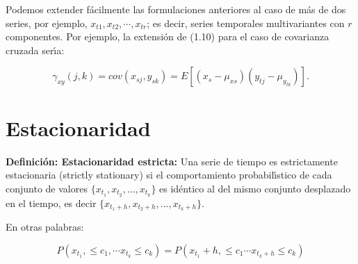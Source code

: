 
Podemos extender f\'acilmente las formulaciones anteriores al caso de m\'as de dos series, por ejemplo, $x_{t1}, x_{t2},\cdots, x_{tr}$; es decir, series temporales multivariantes con $r$ componentes. Por ejemplo, la extensi\'on de (1.10) para el caso de covarianza cruzada ser\'\i{}a:

\begin{equation*}
\gamma_{xy} (j, k) = cov (x_{sj}, y_{sk}) = E [(x_s -\mu_{xs}) (y_{tj} - \mu_{y_{tk}})].
\end{equation*}

%	
\section{Estacionaridad}
\begin{definition}\label{def:def7}
	\textbf{Definici\'on: Estacionaridad estricta:}
Una serie de tiempo es estrictamente estacionaria (strictly stationary) si el comportamiento probabil\'\i{}stico de cada conjunto de valores $\{x_{t_1}, x_{t_2}, ..., x_{t_k}\}$ es id\'entico al del mismo conjunto desplazado en el tiempo, es decir $\{x_{t_1+h} , x_{t_2+h}, ..., x_{t_k + h}\}$.\\
\end{definition} 
En otras palabras:
	
	\begin{equation*}
	P(x_{t_1},\le c_1, \cdots x_{t_k} \le c_k) = P(x_{t_1}+h,\le c_1\cdots x_{t_k+h} \le c_k)
	\end{equation*}
	
